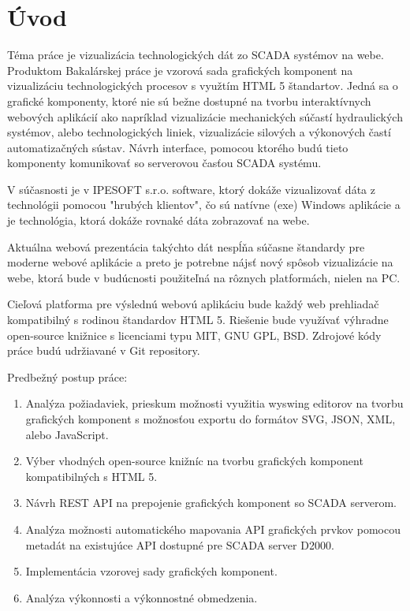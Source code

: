 
\chapter*{Úvod}

Téma práce je vizualizácia technologických dát zo SCADA systémov na webe.  Produktom Bakalárskej práce je  vzorová sada grafických komponent na vizualizáciu technologických procesov s využtím HTML 5 štandartov.  Jedná sa o grafické komponenty, ktoré nie sú bežne dostupné na tvorbu interaktívnych webových aplikácií ako napríklad vizualizácie mechanických súčastí hydraulických systémov, alebo technologických liniek, vizualizácie silových a výkonových častí automatizačných sústav. 
Návrh  interface, pomocou ktorého budú tieto komponenty komunikovať so serverovou časťou SCADA systému. 

V súčasnosti je v IPESOFT s.r.o. software, ktorý dokáže vizualizovať dáta z technológii pomocou "hrubých klientov",  čo sú natívne (exe) Windows aplikácie a je technológia,  ktorá dokáže rovnaké dáta zobrazovať na webe. 

Aktuálna webová prezentácia takýchto dát nespĺňa súčasne štandardy pre moderne webové aplikácie a preto je potrebne nájsť nový spôsob vizualizácie na webe, ktorá bude v budúcnosti použiteľná na rôznych platformách, nielen na PC. 


Cieľová platforma pre výslednú webovú aplikáciu bude každý web prehliadač kompatibilný s rodinou štandardov HTML 5. Riešenie bude využívať výhradne open-source knižnice s licenciami typu MIT, GNU GPL, BSD. Zdrojové kódy práce budú udržiavané v Git repository.

Predbežný postup práce:

\begin{enumerate}
\item  Analýza požiadaviek, prieskum možnosti využitia wyswing editorov na tvorbu grafických komponent s možnosťou exportu do formátov SVG, JSON, XML, alebo JavaScript.
\item Výber vhodných open-source knižníc na tvorbu grafických komponent kompatibilných s HTML 5.
\item Návrh REST API na prepojenie grafických komponent so SCADA serverom.
\item  Analýza možnosti automatického mapovania API grafických prvkov pomocou metadát na existujúce API dostupné pre SCADA server D2000.
\item  Implementácia vzorovej sady grafických komponent.
\item  Analýza výkonnosti a výkonnostné obmedzenia.
\end{enumerate}

